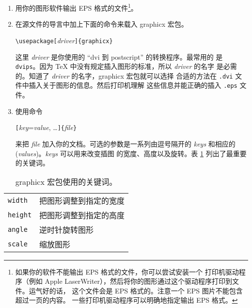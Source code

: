 \begin{enumerate}
\item 用你的图形软件输出 EPS 格式的文件\footnote{如果你的软件不能输出 EPS 
      格式的文件，你可以尝试安装一个 \PSi{} 打印机驱动程序（例如 Apple
      LaserWriter），然后将你的图形通过这个驱动程序打印到文件。运气好的话，
      这个文件会是 EPS 格式的。注意一个 EPS 图片不能包含超过一页的内容。
      一些打印机驱动程序可以明确地指定输出 EPS 格式。}。
\item 在源文件的导言中加上下面的命令来载入 \textsf{graphicx} 宏包。
      \begin{lscommand}
         \verb|\usepackage[|\emph{driver}\verb|]{graphicx}|
      \end{lscommand}
      这里 \emph{driver} 是你使用的 “dvi 到 postscript” 的转换程序。最常用的
      是 \texttt{dvips}。因为 \TeX{} 中没有规定插入图形的标准，所以 \emph{driver} 的名字
      是必需的。知道了 \emph{driver} 的名字，\textsf{graphicx} 宏包就可以选择
      合适的方法在 \texttt{.dvi} 文件中插入关于图形的信息。然后打印机理解
      这些信息并能正确的插入 \texttt{.eps} 文件。
\item 使用命令
      \begin{lscommand}
         \verb|[|\emph{key}=\emph{value}, \ldots\verb|]{|\emph{file}\verb|}|
      \end{lscommand}
      来把 \emph{file} 加入你的文档。可选的参数是一系列由逗号隔开的
       \emph{keys} 和相应的 (\emph{values})。\emph{keys} 可以用来改变插图
      的宽度、高度以及旋转。表 \ref{keyvals} 列出了最重要的关键词。
\end{enumerate}



\begin{table}[!htb]
\caption{\textsf{graphicx} 宏包使用的关键词。} \label{keyvals}
\begin{lined}{9cm}
\begin{tabular}{@{}ll}
\texttt{width}& 把图形调整到指定的宽度\\
\texttt{height}& 把图形调整到指定的高度\\
\texttt{angle}& 逆时针旋转图形\\
\texttt{scale}& 缩放图形\\
\end{tabular}

\bigskip
\end{lined}
\end{table}

